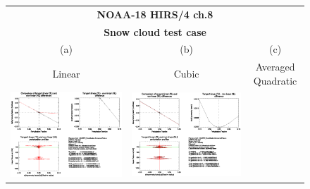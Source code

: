 \begin{figure}[htp]
  \centering
  \begin{tabular}{c c c}
    \multicolumn{3}{c}{\qquad\sffamily\textbf{NOAA-18 HIRS/4 ch.8}}\\
    \multicolumn{3}{c}{\qquad\sffamily\textbf{Snow cloud test case}}\\
    \qquad\textsf{(a)} & \qquad\textsf{(b)}  & \qquad\textsf{(c)} \\
    \qquad\textsf{Linear} & \qquad\textsf{Cubic}  & \qquad\textsf{Averaged Quadratic} \\
    \includegraphics[bb=90 400 300 540,clip,scale=0.7]{graphics/Cloud/TL/hirs4_n18.ch8.SNOW.NLIN.dg_dReff.eps} &
    \includegraphics[bb=90 400 300 540,clip,scale=0.7]{graphics/Cloud/TL/hirs4_n18.ch8.SNOW.NCUBIC.dg_dReff.eps} &

\end{tabular}
\end{figure}
